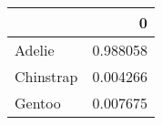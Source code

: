 \begin{tabular}{lr}
\toprule
{} &         0 \\
\midrule
Adelie    &  0.988058 \\
Chinstrap &  0.004266 \\
Gentoo    &  0.007675 \\
\bottomrule
\end{tabular}
